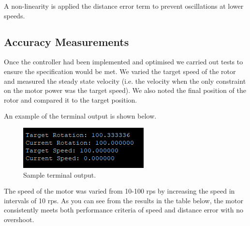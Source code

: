 \documentclass{article}
\begin{document}
\bigskip

\bigskip

\noindent
A non-linearity is applied the distance error term to prevent oscillations at lower speeds.

\subsection{Accuracy Measurements}
\noindent
Once the controller had been implemented and optimised we carried out tests to ensure the specification would be met. We varied the target speed of the rotor and measured the steady state velocity (i.e. the velocity when the only constraint on the motor power was the target speed). We also noted the final position of the rotor and compared it to the target position.

\bigskip

\noindent
An example of the terminal output is shown below.

\begin{figure}[H]
\begin{center}
   \includegraphics[width=0.5\linewidth]{position accuracy.png}
\end{center}
   \caption{Sample terminal output.}
\label{fig:long}
\label{fig:onecol}
\end{figure}

\noindent
The speed of the motor was varied from 10-100 rps by increasing the speed in intervals of 10 rps. As you can see from the results in the table below, the motor consistently meets both performance criteria of speed and distance error with no overshoot.
\end{document}
